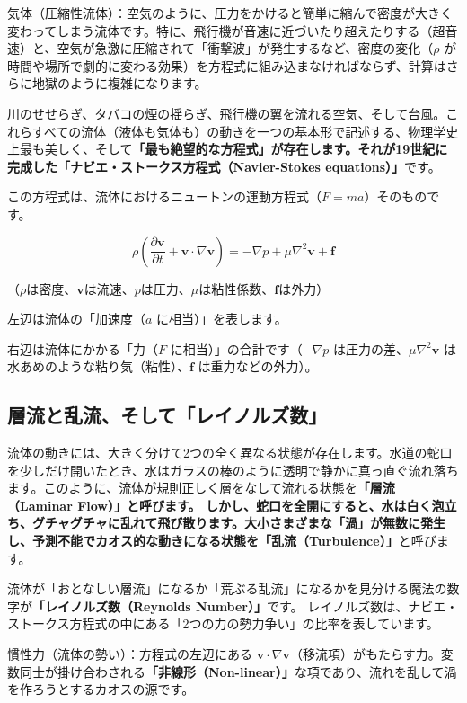 気体（圧縮性流体）：空気のように、圧力をかけると簡単に縮んで密度が大きく変わってしまう流体です。特に、飛行機が音速に近づいたり超えたりする（超音速）と、空気が急激に圧縮されて「衝撃波」が発生するなど、密度の変化（\ensuremath{\rho} が時間や場所で劇的に変わる効果）を方程式に組み込まなければならず、計算はさらに地獄のように複雑になります。

川のせせらぎ、タバコの煙の揺らぎ、飛行機の翼を流れる空気、そして台風。これらすべての流体（液体も気体も）の動きを一つの基本形で記述する、物理学史上最も美しく、そして\textbf{「最も絶望的な方程式」が存在します。それが19世紀に完成した「ナビエ・ストークス方程式（Navier-Stokes equations）」}です。

この方程式は、流体におけるニュートンの運動方程式（\(F=ma\)）そのものです。

\[
\rho\left(\frac{\partial \mathbf{v}}{\partial t}
+ \mathbf{v}\cdot\nabla \mathbf{v}\right)
= -\nabla p + \mu \nabla^2 \mathbf{v} + \mathbf{f}
\]

（\(\rho\)は密度、\(\mathbf{v}\)は流速、\(p\)は圧力、\(\mu\)は粘性係数、\(\mathbf{f}\)は外力）

左辺は流体の「加速度（\(a\) に相当）」を表します。

右辺は流体にかかる「力（\(F\) に相当）」の合計です（\(-\nabla p\) は圧力の差、\ensuremath{\mu\nabla^2\mathbf{v}} は水あめのような粘り気（粘性）、\ensuremath{\mathbf{f}} は重力などの外力）。

\subsection{層流と乱流、そして「レイノルズ数」}

流体の動きには、大きく分けて2つの全く異なる状態が存在します。水道の蛇口を少しだけ開いたとき、水はガラスの棒のように透明で静かに真っ直ぐ流れ落ちます。このように、流体が規則正しく層をなして流れる状態を\textbf{「層流（Laminar Flow）」と呼びます。 しかし、蛇口を全開にすると、水は白く泡立ち、グチャグチャに乱れて飛び散ります。大小さまざまな「渦」が無数に発生し、予測不能でカオス的な動きになる状態を「乱流（Turbulence）」}と呼びます。

流体が「おとなしい層流」になるか「荒ぶる乱流」になるかを見分ける魔法の数字が\textbf{「レイノルズ数（Reynolds Number）」}です。 レイノルズ数は、ナビエ・ストークス方程式の中にある「2つの力の勢力争い」の比率を表しています。

慣性力（流体の勢い）：方程式の左辺にある \ensuremath{\mathbf{v}\cdot\nabla\mathbf{v}}（移流項）がもたらす力。変数同士が掛け合わされる\textbf{「非線形（Non-linear）」}な項であり、流れを乱して渦を作ろうとするカオスの源です。

